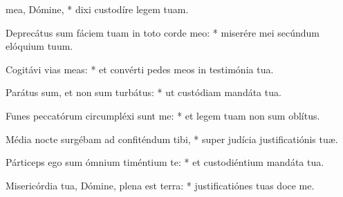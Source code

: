 \begin{psalmus}

 mea, Dómine, * dixi custodíre legem tuam.

Deprecátus sum fáciem tuam in toto corde meo: * miserére mei secúndum elóquium tuum.

Cogitávi vias meas: * et convérti pedes meos in testimónia tua.

Parátus sum, et non sum turbátus: * ut custódiam mandáta tua.

Funes peccatórum circumpléxi sunt me: * et legem tuam non sum oblítus.

Média nocte surgébam ad confiténdum tibi, * super judícia justificatiónis tuæ.

Párticeps ego sum ómnium timéntium te: * et custodiéntium mandáta tua.

Misericórdia tua, Dómine, plena est terra: * justificatiónes tuas doce me.

\end{psalmus}
